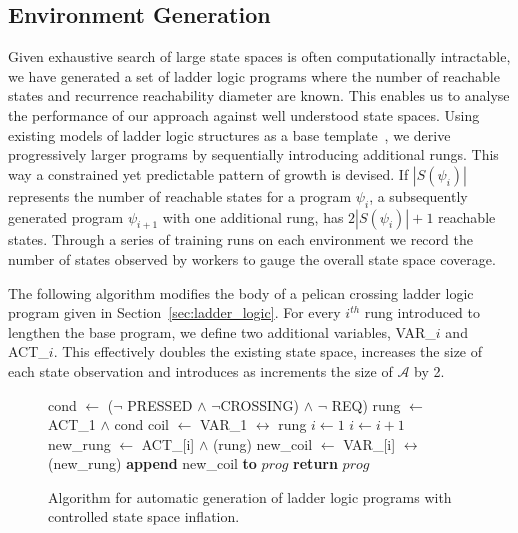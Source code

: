 \documentclass[runningheads]{llncs}
\begin{document}
\subsection{Environment Generation}


Given exhaustive search of large state spaces is often computationally intractable, we have generated a set of ladder logic programs where the number of reachable states and recurrence reachability diameter are known. This enables us to analyse the performance of our approach against well understood state spaces. Using existing models of ladder logic structures as a base template~\cite{james2013verification}, we derive progressively larger programs by sequentially introducing additional rungs. This way a constrained yet predictable pattern of growth is devised. If $|S(\psi_i)|$ represents the number of reachable states for a program $\psi_i$, a subsequently generated program $\psi_{i+1}$ with one additional rung, has $2|S(\psi_i)|+1$ reachable states. Through a series of training runs on each environment we record the number of states observed by workers to gauge the overall state space coverage. 

The following algorithm modifies the body of a pelican crossing ladder logic program given in Section~\ref{sec:ladder_logic}. For every $i^{th}$ rung introduced to lengthen the base program, we define two additional variables, VAR\_$i$ and ACT\_$i$. This effectively doubles the existing state space, increases the size of each state observation and introduces as increments the size of $\mathcal{A}$ by 2.
\begin{figure}[!h]
	\begin{algorithmic}\label{algo:ladder_generation}
		\State cond $\gets$ ($\lnot$ PRESSED $\land$ $\lnot$CROSSING) $\land$ $\lnot$ REQ)
		\State rung $\gets$ ACT\_1 $\land$ cond
		\State coil $\gets$ VAR\_1 $\leftrightarrow$ rung
		\State $i \gets 1$ 
		\State $i \gets i+1$
		\State new\_rung $\gets$ ACT\_[i] $\land$ (rung)
		\State new\_coil $\gets$ VAR\_[i] $\leftrightarrow$ (new\_rung)
		\State \textbf{append} new\_coil \textbf{to} $prog$
		\EndWhile
		\State \textbf{return} $prog$
		\EndProcedure
	\end{algorithmic}
	\caption{Algorithm for automatic generation of ladder logic programs with controlled state space inflation.}
	\label{fig:algorithm}
\end{figure}
\end{document}
